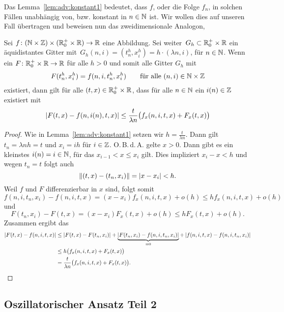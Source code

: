 Das Lemma~\ref{lem:adv:konstant1} bedeutet, dass $f$, oder die Folge $f_n$, in solchen Fällen unabhängig von, bzw. konstant in $n \in \mathbb N$ ist.
Wir wollen dies auf unseren Fall übertragen und beweisen nun das zweidimensionale Analogon, 

\begin{lemma}
Sei $f\colon (\mathbb N \times \mathbb Z) \times (\mathbb R^+_0 \times \mathbb R) \to \mathbb R$ eine Abbildung.
Sei weiter\, $G_h \subset \mathbb R^+_0 \times \mathbb R$ ein äquidistantes Gitter mit\, $G_h(n,i) = (t^h_n, x^h_i) = h \cdot (\lambda n, i)$, für $n \in \mathbb N$.
Wenn ein $F\colon \mathbb R^+_0 \times \mathbb R \to \mathbb R$ für alle $h > 0$ und somit alle Gitter $G_h$ mit
\begin{align}\label{eq:lemma:diag:voraussetzung}
F(t^h_n, x^h_i) = f(n, i, t^h_n, x^h_i) \qquad \text{für alle $(n,i) \in \mathbb N \times \mathbb Z$}
\end{align}
existiert, dann gilt für alle $(t, x) \in \mathbb R^+_0 \times \mathbb R$, dass für alle $n \in \mathbb N$ ein $i(n) \in \mathbb Z$ existiert mit
\begin{align}\label{eq:lemma:diag:aussage}
\left| F(t, x) - f(n, i(n), t, x) \right| \leq \frac {t}{\lambda n} \bigl(f_x(n, i, t, x) + F_x(t, x) \bigr)
\end{align}
\end{lemma}
\begin{proof}
Wie in Lemma~\ref{lem:adv:konstant1} setzen wir $h = \frac {t}{\lambda n}$.
Dann gilt $t_n = \lambda n h = t$ und $x_i = i h$ für $i \in \mathbb Z$.
O.\,B.\,d.\,A. gelte $x > 0$.
Dann gibt es ein kleinstes $i(n) = i \in \mathbb N$, für das $x_{i-1} < x \leq x_i$ gilt.
Dies impliziert $x_i - x < h$ und wegen $t_n = t$ folgt auch
\[ \left\lVert (t,x) - (t_n, x_i) \right\rVert = \left| x - x_i \right| < h. \]
Weil $f$ und $F$ differenzierbar in $x$ sind, folgt somit
\[ f(n, i, t_n, x_i) - f(n, i, t, x) = (x - x_i) f_x(n, i, t, x) + o(h) \leq h f_x(n, i, t, x) + o(h) \]
und
\[ F(t_n, x_i) - F(t, x) = (x - x_i) F_x(t, x) + o(h) \leq h F_x(t, x) + o(h). \]
Zusammen ergibt das
{\small
\begin{align*}
\left| F(t,x) - f(n, i, t, x) \right| &\leq \left| F(t, x) - F(t_n, x_i) \right| + \underbrace{\left| F(t_n, x_i) - f(n, i, t_n, x_i) \right|}_{= 0} + \left| f(n,i, t, x) - f(n, i, t_n, x_i) \right|\\
&\leq h \bigl(f_x(n, i, t, x) + F_x(t, x) \bigr)\\
&= \frac {t}{\lambda n} \bigl(f_x(n, i, t, x) + F_x(t, x) \bigr). \qedhere
\end{align*}
}
\end{proof}

\subsection {Oszillatorischer Ansatz Teil 2}

